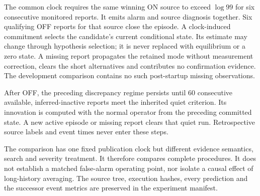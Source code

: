 The common clock requires the same winning ON source to exceed
$\log99$ for six consecutive monitored reports. It emits alarm and source
diagnosis together. Six qualifying OFF reports for that source close the
episode. A clock-induced commitment selects the candidate's current
conditional state. Its estimate may change through hypothesis selection;
it is never replaced with equilibrium or a zero state. A missing report
propagates the retained mode without measurement correction, clears the
short alternatives and contributes no confirmation evidence. The development
comparison contains no such post-startup missing observations.

After OFF, the preceding discrepancy regime persists until 60 consecutive
available, inferred-inactive reports meet the inherited quiet criterion.
Its innovation is computed with the normal operator from the preceding
committed state. A new active episode or missing report clears that quiet
run. Retrospective source labels and event times never enter these steps.

The comparison has one fixed publication clock but different evidence
semantics, search and severity treatment. It therefore compares complete
procedures. It does not establish a matched false-alarm operating point,
nor isolate a causal effect of long-history averaging. The source tree,
execution hashes, every prediction and the successor event metrics are
preserved in the experiment manifest.


